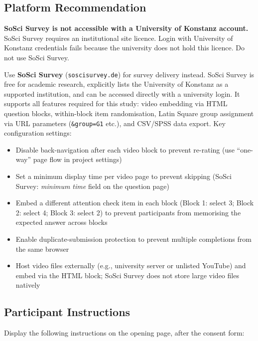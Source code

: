 \documentclass[11pt, a4paper]{article}
\begin{document}
\subsection{Platform Recommendation}

\begin{warnbox}
\textbf{SoSci Survey is not accessible with a University of Konstanz account.} SoSci Survey requires an institutional site licence. Login with University of Konstanz credentials fails because the university does not hold this licence. Do not use SoSci Survey.
\end{warnbox}

Use \textbf{SoSci Survey} (\texttt{soscisurvey.de}) for survey delivery instead. SoSci Survey is free for academic research, explicitly lists the University of Konstanz as a supported institution, and can be accessed directly with a university login. It supports all features required for this study: video embedding via HTML question blocks, within-block item randomisation, Latin Square group assignment via URL parameters (\texttt{\&group=G1} etc.), and CSV/SPSS data export. Key configuration settings:

\begin{itemize}
  \item Disable back-navigation after each video block to prevent re-rating (use ``one-way'' page flow in project settings)
  \item Set a minimum display time per video page to prevent skipping (SoSci Survey: \textit{minimum time} field on the question page)
  \item Embed a different attention check item in each block (Block 1: select 3; Block 2: select 4; Block 3: select 2) to prevent participants from memorising the expected answer across blocks
  \item Enable duplicate-submission protection to prevent multiple completions from the same browser
  \item Host video files externally (e.g., university server or unlisted YouTube) and embed via the HTML block; SoSci Survey does not store large video files natively
\end{itemize}

\subsection{Participant Instructions}

Display the following instructions on the opening page, after the consent form:
\end{document}
